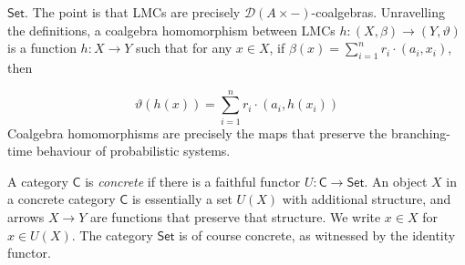 \documentclass[11pt,a4paper]{amsart}
\begin{document}
\hypertarget{html:S2.SS0.SSS0.P0.SPx3.p2.m7}{}\({\mathsf{Set}}\). The point is that LMCs are precisely %
\hypertarget{html:S2.SS0.SSS0.P0.SPx3.p2.m8}{}\({{\mathcal{D}}(A\times-)}\)-coalgebras. Unravelling the definitions, a coalgebra homomorphism between LMCs %
\hypertarget{html:S2.SS0.SSS0.P0.SPx3.p2.m9}{}\({h\colon(X,\beta)\to(Y,\vartheta)}\) is a function %
\hypertarget{html:S2.SS0.SSS0.P0.SPx3.p2.m10}{}\({h\colon X\to Y}\) such that for any %
\hypertarget{html:S2.SS0.SSS0.P0.SPx3.p2.m11}{}\({x\in X}\), if %
\hypertarget{html:S2.SS0.SSS0.P0.SPx3.p2.m12}{}\({\beta(x)=\sum_{i=1}^{n}r_{i}\cdot(a_{i},x_{i})}\), then
\par\medskip
\hypertarget{html:S2.Ex4}{}   %
\hypertarget{html:S2.Ex4.m1}{}\[\vartheta(h(x))=\sum_{i=1}^{n}r_{i}\cdot(a_{i},h(x_{i}))\]    Coalgebra homomorphisms are precisely the maps that preserve the branching-time behaviour of probabilistic systems.
\par\medskip
\hypertarget{html:S2.SS0.SSS0.P0.SPx3.p3}{} A category %
\hypertarget{html:S2.SS0.SSS0.P0.SPx3.p3.m1}{}\({\mathsf{C}}\) is \emph{concrete} if there is a faithful functor %
\hypertarget{html:S2.SS0.SSS0.P0.SPx3.p3.m2}{}\({U\colon\mathsf{C}\to\mathsf{Set}}\). An object %
\hypertarget{html:S2.SS0.SSS0.P0.SPx3.p3.m3}{}\({X}\) in a concrete category %
\hypertarget{html:S2.SS0.SSS0.P0.SPx3.p3.m4}{}\({\mathsf{C}}\) is essentially a set %
\hypertarget{html:S2.SS0.SSS0.P0.SPx3.p3.m5}{}\({U(X)}\) with additional structure, and arrows %
\hypertarget{html:S2.SS0.SSS0.P0.SPx3.p3.m6}{}\({X\to Y}\) are functions that preserve that structure. We write %
\hypertarget{html:S2.SS0.SSS0.P0.SPx3.p3.m7}{}\({x\in X}\) for %
\hypertarget{html:S2.SS0.SSS0.P0.SPx3.p3.m8}{}\({x\in U(X)}\). The category %
\hypertarget{html:S2.SS0.SSS0.P0.SPx3.p3.m9}{}\({\mathsf{Set}}\) is of course concrete, as witnessed by the identity functor.
\par\medskip
\end{document}
